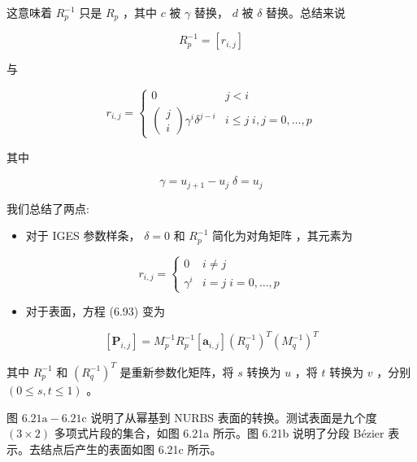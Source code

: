 \documentclass[../main.tex]{subfiles}
\begin{document}
这意味着 \({R}_{p}^{-1}\) 只是 \({R}_{p}\) ，其中 \(c\) 被 \(\gamma\) 替换， \(d\) 被 \(\delta\) 替换。总结来说

\[
{R}_{p}^{-1} = \left\lbrack  {r}_{i,j}\right\rbrack
\]

与

\[
{r}_{i,j} = \left\{  \begin{matrix} 0 & j < i \\  \left( \begin{matrix} j \\  i \end{matrix}\right) {\gamma }^{i}{\delta }^{j - i} & i \leq  j\;i,j = 0,\ldots ,p \end{matrix}\right.  \tag{6.98}
\]

其中

\[
\gamma  = {u}_{j + 1} - {u}_{j}\;\delta  = {u}_{j}
\]

我们总结了两点:

\begin{itemize}
\item 对于 IGES 参数样条， \(\delta  = 0\) 和 \({R}_{p}^{-1}\) 简化为对角矩阵 \cite{IGE93}，其元素为
\end{itemize}

\[
{r}_{i,j} = \left\{  \begin{array}{ll} 0 & i \neq  j \\  {\gamma }^{i} & i = j\;i = 0,\ldots ,p \end{array}\right.  \tag{6.99}
\]

\begin{itemize}
\item 对于表面，方程 (6.93) 变为
\end{itemize}

\[
\left\lbrack  {\mathbf{P}}_{i,j}\right\rbrack   = {M}_{p}^{-1}{R}_{p}^{-1}\left\lbrack  {\mathbf{a}}_{i,j}\right\rbrack  {\left( {R}_{q}^{-1}\right) }^{T}{\left( {M}_{q}^{-1}\right) }^{T}
\]

其中 \({R}_{p}^{-1}\) 和 \({\left( {R}_{q}^{-1}\right) }^{T}\) 是重新参数化矩阵，将 \(s\) 转换为 \(u\) ，将 \(t\) 转换为 \(v\) ，分别 \(\left( {0 \leq  s,t \leq  1}\right)\) 。

图 \({6.21}\mathrm{a} - {6.21}\mathrm{c}\) 说明了从幂基到 NURBS 表面的转换。测试表面是九个度 \(\left( {3 \times  2}\right)\) 多项式片段的集合，如图 6.21a 所示。图 6.21b 说明了分段 Bézier 表示。去结点后产生的表面如图 6.21c 所示。
\end{document}
